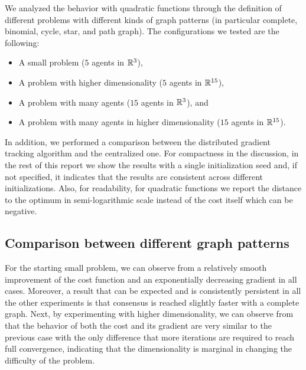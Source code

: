 \documentclass[a4paper,11pt,oneside]{book}
\begin{document}
We analyzed the behavior with quadratic functions through the definition of different problems with different kinds of graph patterns (in particular complete, binomial, cycle, star, and path graph). The configurations we tested are the following:
\begin{itemize}
      \item A small problem ($5$ agents in ${\mathbb{R}}^3$),
      \item A problem with higher dimensionality ($5$ agents in ${\mathbb{R}}^{15}$),
      \item A problem with many agents ($15$ agents in ${\mathbb{R}}^3$), and
      \item A problem with many agents in higher dimensionality ($15$ agents in ${\mathbb{R}}^{15}$).
\end{itemize}
In addition, we performed a comparison between the distributed gradient tracking algorithm and the centralized one. For compactness in the discussion, in the rest of this report we show the results with a single initialization seed and, if not specified, it indicates that the results are consistent across different initializations. Also, for readability, for quadratic functions we report the distance to the optimum in semi-logarithmic scale instead of the cost itself which can be negative.


\subsection{Comparison between different graph patterns}

For the starting small problem, we can observe from  a relatively smooth improvement of the cost function and an exponentially decreasing gradient in all cases. Moreover, a result that can be expected and is consistently persistent in all the other experiments is that consensus is reached slightly faster with a complete graph. Next, by experimenting with higher dimensionality, we can observe from  that the behavior of both the cost and its gradient are very similar to the previous case with the only difference that more iterations are required to reach full convergence, indicating that the dimensionality is marginal in changing the difficulty of the problem. 
\end{document}
